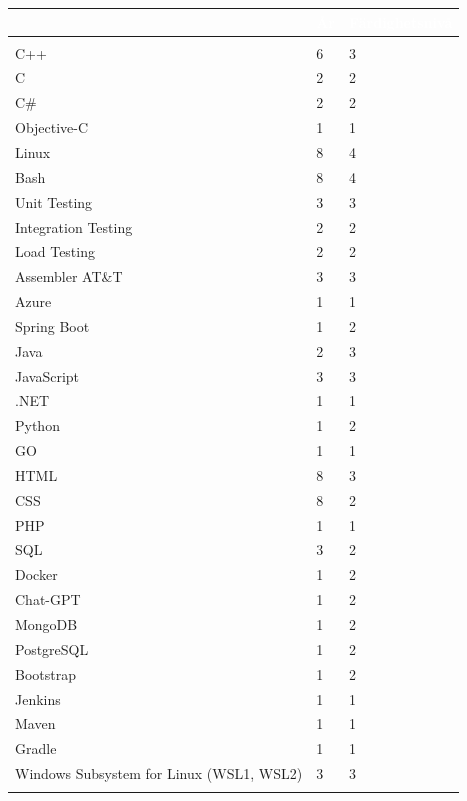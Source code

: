 \documentclass{article}
\begin{document}
\begin{tabular}{|l|l|l|}
	\hline
	\rowcolor{colorBlue}
\multicolumn{1}{|l|}{\textcolor{white}{\textbf{Kompetens}}} & \multicolumn{1}{l|}{\textcolor{white}{\textbf{År}}} & \multicolumn{1}{|l|}{\textcolor{white}{\textbf{Färdighetsnivå}}} \\
\hline
\rowcolor{colorBlueTwo}
\multicolumn{3}{|l|}{\textcolor{white}{\textbf{Färdighetsnivå}}} \\
\hline
	C++ & 6 & 3 \\
	\hline
	C & 2 & 2 \\
	\hline
	C\# & 2 & 2 \\
	\hline
	Objective-C & 1 & 1 \\
	\hline
	Linux & 8 & 4 \\
	\hline
	Bash & 8 & 4 \\
	\hline
	Unit Testing & 3 & 3 \\
	\hline
	Integration Testing & 2 & 2 \\
	\hline
	Load Testing & 2 & 2 \\
	\hline
	Assembler AT\&T & 3 & 3 \\
	\hline
	Azure & 1 & 1 \\
	\hline
	Spring Boot & 1 & 2 \\
	\hline
	Java & 2 & 3 \\
	\hline
	JavaScript & 3 & 3 \\
	\hline
	.NET & 1 & 1 \\
	\hline
	Python & 1 & 2 \\
	\hline
	GO & 1 & 1 \\
	\hline
	HTML & 8 & 3 \\
	\hline
	CSS & 8 & 2 \\
	\hline
	PHP & 1 & 1 \\
	\hline
	SQL & 3 & 2 \\
	\hline
	Docker & 1 & 2 \\
	\hline
	Chat-GPT & 1 & 2 \\
	\hline
	MongoDB & 1 & 2 \\
	\hline
	PostgreSQL & 1 & 2 \\
	\hline
	Bootstrap & 1 & 2 \\
	\hline
	Jenkins & 1 & 1 \\
	\hline
	Maven & 1 & 1 \\
	\hline
	Gradle & 1 & 1 \\
	\hline
	Windows Subsystem for Linux (WSL1, WSL2) & 3 & 3 \\
	\hline
	\rowcolor{colorBlueTwo}
	\multicolumn{3}{|l|}{\textcolor{white}{\textbf{Applikationskunskap}}} \\

\end{tabular}
\end{document}
